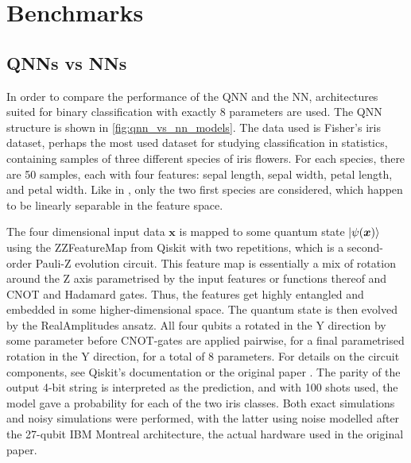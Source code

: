 
\section{Benchmarks}
\subsection{QNNs vs NNs}\label{sec:qnn-vs-nn}
In order to compare the performance of the QNN and the NN, architectures suited for binary classification with exactly 8 parameters are used. The QNN structure is shown in \cref{fig:qnn_vs_nn_models}. The data used is Fisher's iris dataset, perhaps the most used dataset for studying classification in statistics, containing samples of three different species of iris flowers. For each species, there are 50 samples, each with four features: sepal length, sepal width, petal length, and petal width. Like in \cite{abbas2021}, only the two first species are considered, which happen to be linearly separable in the feature space.

The four dimensional input data $\bm{x}$ is mapped to some quantum state $\ket{\psi(\bm{x})}$ using the ZZFeatureMap from Qiskit with two repetitions, which is a second-order Pauli-Z evolution circuit. This feature map is essentially a mix of rotation around the Z axis parametrised by the input features or functions thereof and CNOT and Hadamard gates. Thus, the features get highly entangled and embedded in some higher-dimensional space. The quantum state is then evolved by the RealAmplitudes ansatz. All four qubits a rotated in the Y direction by some parameter before CNOT-gates are applied pairwise, for a final parametrised rotation in the Y direction, for a total of 8 parameters. For details on the circuit components, see Qiskit's documentation \cite{qiskit} or the original paper \cite{abbas2021}. The parity of the output 4-bit string is interpreted as the prediction, and with 100 shots used, the model gave a probability for each of the two iris classes. Both exact simulations and noisy simulations were performed, with the latter using noise modelled after the 27-qubit IBM Montreal architecture, the actual hardware used in the original paper.

